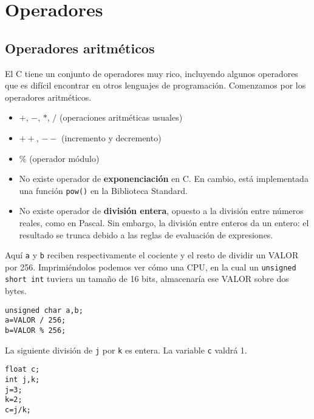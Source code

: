 \chapter{Operadores}
\label{chap:tc-operadores}

\section{Operadores aritméticos}
El C tiene un conjunto de operadores muy rico, incluyendo algunos operadores que es difícil encontrar en otros lenguajes de programación. Comenzamos por los operadores aritméticos.
\begin{itemize}
	\item $+$, $-$, $*$, $/$ (operaciones aritméticas usuales)
	\item $++$, $--$ (incremento y decremento)
	\item $\%$ (operador módulo)
	\item No existe operador de \textbf{exponenciación} en C. En cambio, está implementada una función \lstinline{pow()} en la Biblioteca Standard.
	\item No existe operador de \textbf{división entera}, opuesto a la división entre números reales, como en Pascal. Sin embargo, la división entre enteros da un entero: el resultado se trunca debido a las reglas de evaluación de expresiones.
\end{itemize}

\begin{ejemplo}
Aquí \lstinline{a} y \lstinline{b} reciben respectivamente el cociente y el resto de dividir un VALOR por 256. Imprimiéndolos podemos ver cómo una CPU, en la cual un \lstinline{unsigned short int} tuviera un tamaño de 16 bits, almacenaría ese VALOR sobre dos bytes.
\begin{lstlisting}
unsigned char a,b;
a=VALOR / 256;
b=VALOR % 256;  	
\end{lstlisting}
\end{ejemplo}  

\begin{ejemplo}
La siguiente división de \lstinline{j} por \lstinline{k} es entera. La variable \lstinline{c} valdrá 1.
\begin{lstlisting}
float c;
int j,k;
j=3; 
k=2;
c=j/k; 
\end{lstlisting}
\end{ejemplo}



